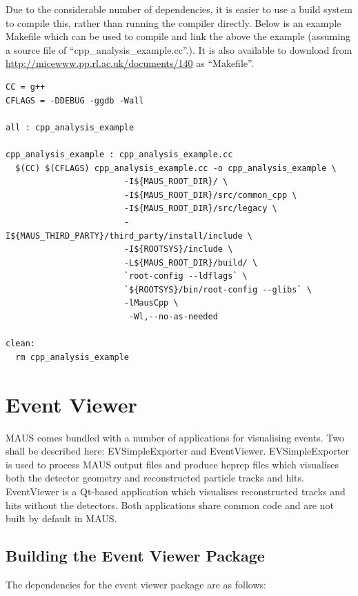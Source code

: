 \documentclass[a4paper,10pt]{article}
\begin{document}
Due to the considerable number of dependencies, it is easier to use a build system to compile this, rather than running the compiler directly.  Below is an example Makefile which can be used to compile and link the above the example (assuming a source file of ``cpp\_analysis\_example.cc''.). It is also available to download from \url{http://micewww.pp.rl.ac.uk/documents/140} as ``Makefile''.

\newpage

\lstset{style=custommake}

\begin{lstlisting}
CC = g++
CFLAGS = -DDEBUG -ggdb -Wall

all : cpp_analysis_example

cpp_analysis_example : cpp_analysis_example.cc
  $(CC) $(CFLAGS) cpp_analysis_example.cc -o cpp_analysis_example \
                        -I${MAUS_ROOT_DIR}/ \
                        -I${MAUS_ROOT_DIR}/src/common_cpp \
                        -I${MAUS_ROOT_DIR}/src/legacy \
                        -I${MAUS_THIRD_PARTY}/third_party/install/include \
                        -I${ROOTSYS}/include \
                        -L${MAUS_ROOT_DIR}/build/ \
                        `root-config --ldflags` \
                        `${ROOTSYS}/bin/root-config --glibs` \
                        -lMausCpp \
                         -Wl,--no-as-needed

clean:
  rm cpp_analysis_example
\end{lstlisting}

\section{Event Viewer}

MAUS comes bundled with a number of applications for visualising events. Two shall be described here: EVSimpleExporter and EventViewer. EVSimpleExporter is used to process MAUS output files and produce heprep files which visualises both the detector geometry and reconstructed particle tracks and hits. EventViewer is a Qt-based application which visualises reconstructed tracks and hits without the detectors. Both applications share common code and are not built by default in MAUS.

\subsection{Building the Event Viewer Package}
The dependencies for the event viewer package are as follows:
\end{document}
